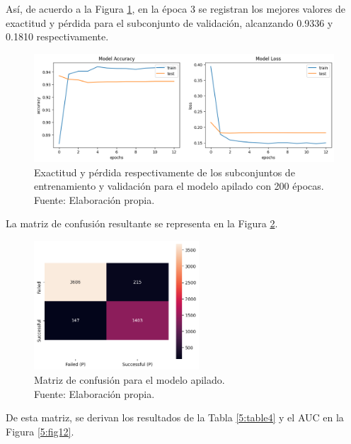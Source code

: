 Así, de acuerdo a la Figura \ref{5:fig10}, en la época 3 se registran los mejores valores de exactitud y pérdida para el subconjunto de validación, alcanzando 0.9336 y 0.1810 respectivamente.

\begin{figure}[!ht]
	\begin{center}
		\includegraphics[width=1\textwidth]{5/figures/stacked_model_acc_loss.png}
		\caption[Exactitud y pérdida respectivamente de los subconjuntos de entrenamiento y validación para el modelo apilado con 200 épocas]{Exactitud y pérdida respectivamente de los subconjuntos de entrenamiento y validación para el modelo apilado con 200 épocas.\\
		Fuente: Elaboración propia.}
		\label{5:fig10}
	\end{center}
\end{figure}

La matriz de confusión resultante se representa en la Figura \ref{5:fig11}.
\begin{figure}[!ht]
	\begin{center}
		\includegraphics[width=0.55\textwidth]{5/figures/stacked_confusion_matrix.png}
		\caption[Matriz de confusión para el modelo apilado]{Matriz de confusión para el modelo apilado.\\
		Fuente: Elaboración propia.}
		\label{5:fig11}
	\end{center}
\end{figure}

De esta matriz, se derivan los resultados de la Tabla \ref{5:table4} y el AUC en la Figura \ref{5:fig12}.

